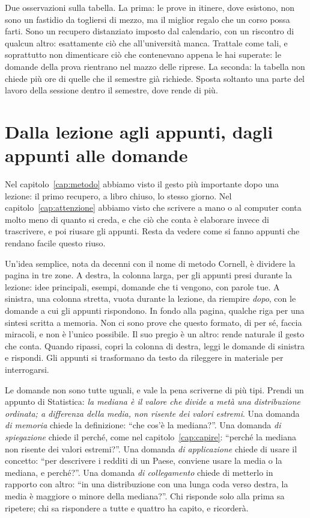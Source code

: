 Due osservazioni sulla tabella. La prima: le prove in itinere, dove
esistono, non sono un fastidio da togliersi di mezzo, ma il miglior
regalo che un corso possa farti. Sono un recupero distanziato imposto
dal calendario, con un riscontro di qualcun altro: esattamente ciò che
all'università manca. Trattale come tali, e soprattutto non
dimenticare ciò che contenevano appena le hai superate: le domande
della prova rientrano nel mazzo delle riprese. La seconda: la tabella
non chiede più ore di quelle che il semestre già richiede. Sposta
soltanto una parte del lavoro della sessione dentro il semestre, dove
rende di più.

\section{Dalla lezione agli appunti, dagli appunti alle domande}

Nel capitolo~\ref{cap:metodo} abbiamo visto il gesto più importante
dopo una lezione: il primo recupero, a libro chiuso, lo stesso giorno.
Nel capitolo~\ref{cap:attenzione} abbiamo visto che scrivere a mano o
al computer conta molto meno di quanto si creda, e che ciò che conta
è elaborare invece di trascrivere, e poi riusare gli appunti. Resta da
vedere come si fanno appunti che rendano facile questo riuso.

Un'idea semplice, nota da decenni con il nome di metodo Cornell, è
dividere la pagina in tre zone. A destra, la colonna larga, per gli
appunti presi durante la lezione: idee principali, esempi, domande che
ti vengono, con parole tue. A sinistra, una colonna stretta, vuota
durante la lezione, da riempire \emph{dopo}, con le domande a cui gli
appunti rispondono. In fondo alla pagina, qualche riga per una sintesi
scritta a memoria. Non ci sono prove che questo formato, di per sé,
faccia miracoli, e non è l'unico possibile. Il suo pregio è un altro:
rende naturale il gesto che conta. Quando ripassi, copri la colonna
di destra, leggi le domande di sinistra e rispondi. Gli appunti si
trasformano da testo da rileggere in materiale per interrogarsi.

Le domande non sono tutte uguali, e vale la pena scriverne di più
tipi. Prendi un appunto di Statistica: \emph{la mediana è il valore che
divide a metà una distribuzione ordinata; a differenza della media, non
risente dei valori estremi}. Una domanda \emph{di memoria} chiede la
definizione: \enquote{che cos'è la mediana?}. Una domanda \emph{di
spiegazione} chiede il perché, come nel capitolo~\ref{cap:capire}:
\enquote{perché la mediana non risente dei valori estremi?}. Una
domanda \emph{di applicazione} chiede di usare il concetto:
\enquote{per descrivere i redditi di un Paese, conviene usare la media
o la mediana, e perché?}. Una domanda \emph{di collegamento} chiede
di metterlo in rapporto con altro: \enquote{in una distribuzione con
una lunga coda verso destra, la media è maggiore o minore della
mediana?}. Chi risponde solo alla prima sa ripetere; chi sa
rispondere a tutte e quattro ha capito, e ricorderà.

